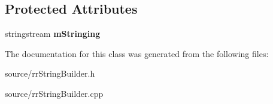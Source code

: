 \subsection*{Protected Attributes}
\begin{DoxyCompactItemize}
\item 
\hypertarget{classrr_1_1_string_builder_a2e6e3fc9b0cd309a83bea1b29797491e}{stringstream {\bfseries m\-Stringing}}\label{classrr_1_1_string_builder_a2e6e3fc9b0cd309a83bea1b29797491e}

\end{DoxyCompactItemize}


The documentation for this class was generated from the following files\-:\begin{DoxyCompactItemize}
\item 
source/rr\-String\-Builder.\-h\item 
source/rr\-String\-Builder.\-cpp\end{DoxyCompactItemize}
